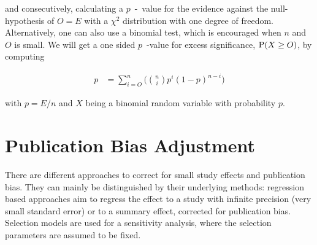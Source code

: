 \documentclass[11pt,a4paper,twoside]{book}\usepackage[]{graphicx}\usepackage[]{color}
\begin{document}
and consecutively, calculating a $p$\hspace{0.4mm}~-~value for the evidence against the null-hypothesis of $O = E$ with a $\chi^2$ distribution with one degree of freedom. Alternatively, one can also use a binomial test, which is encouraged when $n$ and $O$ is small. We will get a one sided $p$\hspace{0.4mm}~-value for excess significance, $\P(X \geq O)$, by computing

\begin{align}
p &= \sum_{i = O}^n\Big({n \choose i} p^i (1-p)^{n - i}\Big) \nonumber
\end{align}

with $p = E/n$ and $X$ being a binomial random variable with probability $p$. 











\section{Publication Bias Adjustment}
There are different approaches to correct for small study effects and publication bias. They can mainly be distinguished by their underlying methods: regression based approaches aim to regress the effect to a study with infinite precision (\ie very small standard error) or to a summary effect, corrected for publication bias. Selection models are used for a sensitivity analysis, where the selection parameters are assumed to be fixed. 
\end{document}
